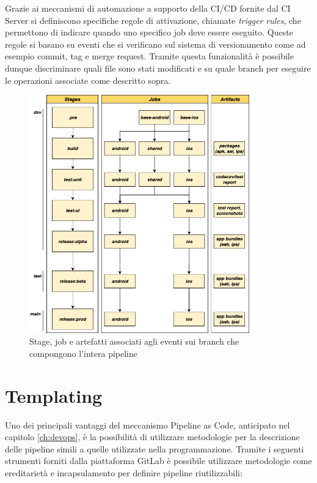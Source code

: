 Grazie ai meccanismi di automazione a supporto della CI/CD fornite dal CI Server si definiscono specifiche regole di attivazione, chiamate \textit{trigger rules}, che permettono di indicare quando uno specifico job deve essere eseguito. Queste regole si basano su eventi che si verificano sul sistema di versionamento come ad esempio commit, tag e merge request. Tramite questa funzionalità è possibile dunque discriminare quali file sono stati modificati e su quale branch per eseguire le operazioni associate come descritto sopra.

\begin{figure}[H]
    \centering
    \includegraphics[width=0.85\textwidth]{img/cicd-branch-jobs.png}
    \caption{Stage, job e artefatti associati agli eventi sui branch che compongono l'intera pipeline}
    \label{pipeline-branches}
\end{figure}

\section{Templating}
Uno dei principali vantaggi del meccanismo Pipeline as Code, anticipato nel capitolo \ref{ch:devops}, è la possibilità di utilizzare metodologie per la descrizione delle pipeline simili a quelle utilizzate nella programmazione. Tramite i seguenti strumenti forniti dalla piattaforma GitLab è possibile utilizzare metodologie come ereditarietà e incapsulamento per definire pipeline riutilizzabili:

